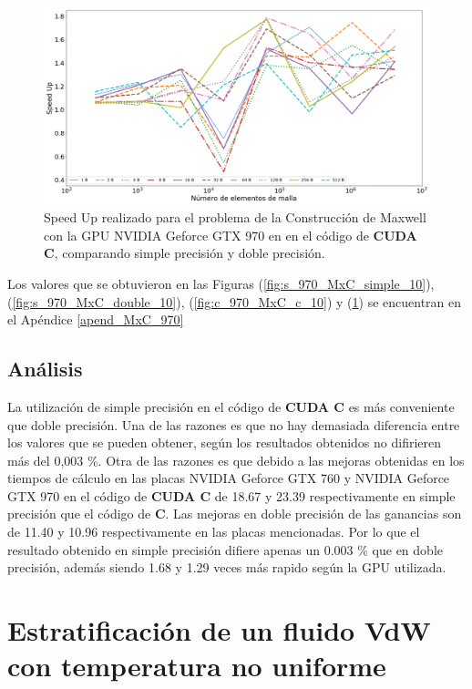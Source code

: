 \begin{figure}[h!]
	\centering
	\includegraphics[width=\textwidth]{figs/cap4/c_970_MxC_cuda_10}
	\caption{Speed Up realizado para el problema de la Construcción de Maxwell con la GPU NVIDIA Geforce GTX 970 en en el código de \textbf{CUDA C}, comparando simple precisión y doble precisión.} 
	\label{fig:c_970_MxC_cuda_10}	
\end{figure}

Los valores que se obtuvieron en las Figuras (\ref{fig:s_970_MxC_simple_10}), (\ref{fig:s_970_MxC_double_10}), (\ref{fig:c_970_MxC_c_10}) y (\ref{fig:c_970_MxC_cuda_10}) se encuentran en el Apéndice \ref{apend_MxC_970}


\subsection{Análisis}

La utilización de simple precisión en el código de \textbf{CUDA C} es más conveniente que doble precisión. Una de las razones es que no hay demasiada diferencia entre los valores que se pueden obtener, según los resultados obtenidos no difirieren más del 0,003 \%. Otra de las razones es que debido a las mejoras obtenidas en los tiempos de cálculo en las placas NVIDIA Geforce GTX 760 y NVIDIA Geforce GTX 970 en el código de \textbf{CUDA C} de 18.67 y 23.39 respectivamente en simple precisión que el código de \textbf{C}. Las mejoras en doble precisión de las ganancias son de 11.40 y 10.96 respectivamente en las placas mencionadas. Por lo que el resultado obtenido en simple precisión difiere apenas un 0.003 \% que en doble precisión, además siendo 1.68 y 1.29 veces más rapido según la GPU utilizada.



\section{Estratificación de un fluido VdW con temperatura no uniforme}

